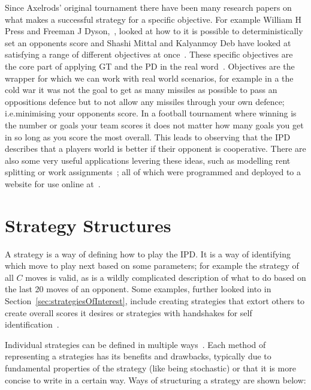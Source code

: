 Since Axelrods' original tournament there have been many research papers on what makes a successful strategy for a specific objective.
For example William H Press and Freeman J Dyson,~\cite{press2012iterated}, looked at how to it is possible to deterministically set an opponents score and Shashi Mittal and Kalyanmoy Deb have looked at satisfying a range of different objectives at once~\cite{mittal2009optimal}.
These specific objectives are the core part of applying GT and the PD in the real word~\cite{rehmeyer2012climateNegotiations,osang2013environmental,Schneier2012doping}.
Objectives are the wrapper for which we can work with real world scenarios, for example in a the cold war it was not the goal to get as many missiles as possible to pass an oppositions defence but to not allow any missiles through your own defence; i.e.minimising your opponents score.
In a football tournament where winning is the number or goals your team scores it does not matter how many goals you get in so long as you score the most overall.
This leads to observing that the IPD describes that a players world is better if their opponent is cooperative.  
There are also some very useful applications levering these ideas, such as modelling rent splitting or work assignments~\cite{goldman2015spliddit}; all of which were programmed and deployed to a website for use online at~\cite{spliddit}.

\section{Strategy Structures}\label{sec:stratergyStructures}
A strategy is a way of defining how to play the IPD. 
It is a way of identifying which move to play next based on some parameters; for example the strategy of all $C$ moves is valid, as is a wildly complicated description of what to do based on the last 20 moves of an opponent.
Some examples, further looked into in Section~\ref{sec:strategiesOfInterest}, include creating strategies that extort others to create overall scores it desires or strategies with handshakes for self identification~\cite{knight2017evolution}.

Individual strategies can be defined in multiple ways~\cite{harper2017reinforcement}.
Each method of representing a strategies has its benefits and drawbacks, typically due to fundamental properties of the strategy (like being stochastic) or that it is more concise to write in a certain way.
Ways of structuring a strategy are shown below:

